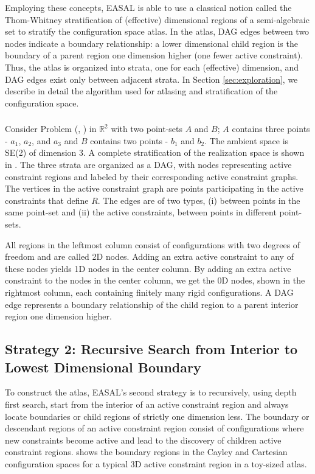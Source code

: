 Employing these concepts, EASAL is able to use a classical notion called the
Thom-Whitney stratification \cite{Kuo} of (effective) dimensional regions of a
semi-algebraic set to stratify the configuration space atlas. In the atlas, DAG
edges between two nodes indicate a boundary relationship: a lower dimensional
child region is the boundary of a parent region one dimension higher (one fewer
active constraint). Thus, the atlas is organized into strata, one for each
(effective) dimension, and DAG edges exist only between adjacent strata. In
Section \ref{sec:exploration}, we describe in detail the algorithm used for
atlasing and stratification of the configuration space.

\subsubsection{\toytwod}
\label{sec:toytwod}
Consider Problem (\cone, \ctwo) in $\mathbb{R}^2$ with two point-sets $A$ and
$B$; $A$ contains three points - $a_1$, $a_2$, and $a_3$ and $B$ contains two
points - $b_1$ and $b_2$. The ambient space is SE(2) of dimension 3. A complete
stratification of the realization space is shown in
. The three strata are organized as a DAG,
with nodes representing active constraint regions and labeled by their
corresponding active constraint graphs.  The vertices in the active constraint
graph are points participating in the active constraints that define $R$. The
edges are of two types, (i) between points in the same point-set and (ii) the
active constraints, between points in different point-sets.

All regions in the leftmost column
consist of configurations with two degrees of freedom and are called 2D nodes.
Adding an extra active constraint to any of these nodes yields 1D nodes in the
center column. By adding an extra active constraint to the nodes in the center
column, we get the 0D nodes, shown in the rightmost column, each containing
finitely many rigid configurations. A DAG edge represents a boundary
relationship of the child region to a parent interior region one dimension
higher. 


\subsection{Strategy 2: Recursive Search from Interior to Lowest Dimensional Boundary}
\label{sec:recursiveBoundarySearch}
To construct the atlas, EASAL's second strategy is to recursively, using depth
first search, start from the interior of an active constraint region and always
locate boundaries or child regions of strictly one dimension less. The
boundary or descendant regions of an active constraint region consist of
configurations where new constraints become active and lead to the discovery of
children active constraint regions.  shows the
boundary regions in the Cayley and Cartesian configuration spaces for a typical
3D active constraint region in a toy-sized atlas.



